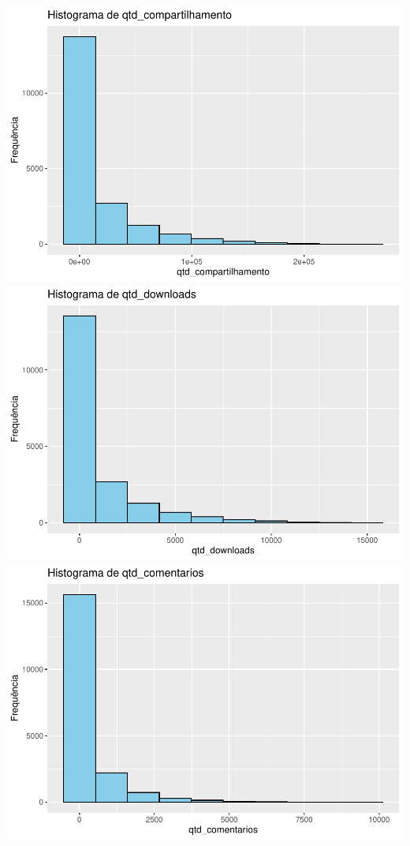 \documentclass[
]{article}
\begin{document}
\includegraphics{dados_videos_files/figure-latex/histogramas_variaveis-4.pdf}
\includegraphics{dados_videos_files/figure-latex/histogramas_variaveis-5.pdf}
\includegraphics{dados_videos_files/figure-latex/histogramas_variaveis-6.pdf}
\end{document}
